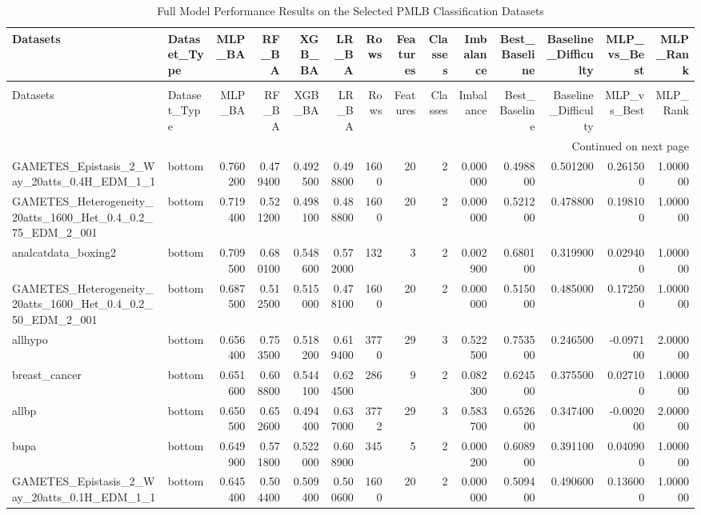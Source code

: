 \begin{longtable}{llrrrrrrrrrrrr}
\caption{Full Model Performance Results on the Selected PMLB Classification Datasets} \label{tab:full_results} \\
\toprule
Datasets & Dataset\_Type & MLP\_BA & RF\_BA & XGB\_BA & LR\_BA & Rows & Features & Classes & Imbalance & Best\_Baseline & Baseline\_Difficulty & MLP\_vs\_Best & MLP\_Rank \\
\midrule
\endfirsthead
\caption[]{Full Model Performance Results on the Selected PMLB Classification Datasets} \\
\toprule
Datasets & Dataset\_Type & MLP\_BA & RF\_BA & XGB\_BA & LR\_BA & Rows & Features & Classes & Imbalance & Best\_Baseline & Baseline\_Difficulty & MLP\_vs\_Best & MLP\_Rank \\
\midrule
\endhead
\midrule
\multicolumn{14}{r}{Continued on next page} \\
\midrule
\endfoot
\bottomrule
\endlastfoot
GAMETES\_Epistasis\_2\_Way\_20atts\_0.4H\_EDM\_1\_1 & bottom & 0.760200 & 0.479400 & 0.492500 & 0.498800 & 1600 & 20 & 2 & 0.000000 & 0.498800 & 0.501200 & 0.261500 & 1.000000 \\
GAMETES\_Heterogeneity\_20atts\_1600\_Het\_0.4\_0.2\_75\_EDM\_2\_001 & bottom & 0.719400 & 0.521200 & 0.498100 & 0.488800 & 1600 & 20 & 2 & 0.000000 & 0.521200 & 0.478800 & 0.198100 & 1.000000 \\
analcatdata\_boxing2 & bottom & 0.709500 & 0.680100 & 0.548600 & 0.572000 & 132 & 3 & 2 & 0.002900 & 0.680100 & 0.319900 & 0.029400 & 1.000000 \\
GAMETES\_Heterogeneity\_20atts\_1600\_Het\_0.4\_0.2\_50\_EDM\_2\_001 & bottom & 0.687500 & 0.512500 & 0.515000 & 0.478100 & 1600 & 20 & 2 & 0.000000 & 0.515000 & 0.485000 & 0.172500 & 1.000000 \\
allhypo & bottom & 0.656400 & 0.753500 & 0.518200 & 0.619400 & 3770 & 29 & 3 & 0.522500 & 0.753500 & 0.246500 & -0.097100 & 2.000000 \\
breast\_cancer & bottom & 0.651600 & 0.608800 & 0.544100 & 0.624500 & 286 & 9 & 2 & 0.082300 & 0.624500 & 0.375500 & 0.027100 & 1.000000 \\
allbp & bottom & 0.650500 & 0.652600 & 0.494400 & 0.637000 & 3772 & 29 & 3 & 0.583700 & 0.652600 & 0.347400 & -0.002000 & 2.000000 \\
bupa & bottom & 0.649900 & 0.571800 & 0.522000 & 0.608900 & 345 & 5 & 2 & 0.000200 & 0.608900 & 0.391100 & 0.040900 & 1.000000 \\
GAMETES\_Epistasis\_2\_Way\_20atts\_0.1H\_EDM\_1\_1 & bottom & 0.645400 & 0.504400 & 0.509400 & 0.500600 & 1600 & 20 & 2 & 0.000000 & 0.509400 & 0.490600 & 0.136000 & 1.000000 \\

\end{longtable}
